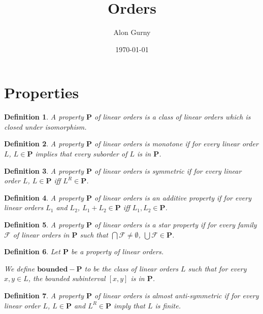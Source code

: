 \documentclass{article}
\author{Alon Gurny}
\title{Orders}
\date{\today}
\newtheorem{definition}{Definition}
\newcommand{\bounded}{\mathbf{bounded}}
\newcommand{\pp}{\mathbf{P}}
\begin{document}
\maketitle

\section{Properties}
\begin{definition}
  A \emph{property} $\pp$ of linear orders is a class of linear orders which
  is closed under isomorphism.
\end{definition}

\begin{definition}
  A property $\pp$ of linear orders is \emph{monotone} if for every linear order $L$,
  $L \in \pp$ implies that every suborder of $L$ is in $\pp$.
\end{definition}

\begin{definition}
  A property $\pp$ of linear orders is \emph{symmetric} if for every linear order $L$,
  $L \in \pp$ iff $L^R \in \pp$.
\end{definition}

\begin{definition}
  A property $\pp$ of linear orders is an \emph{additive property} if for every linear orders $L_1$ and $L_2$,
  $L_1 + L_2 \in \pp$ iff $L_1, L_2 \in \pp$.
\end{definition}

\begin{definition}
  A property $\pp$ of linear orders is a \emph{star property} if for every family
  $\mathcal{F}$ of linear orders in $\pp$ such that $\bigcap \mathcal{F} \ne \emptyset$,
  $\bigcup \mathcal{F} \in \pp$.
\end{definition}

\begin{definition}
  Let $\pp$ be a property of linear orders.

  We define $\bounded-\pp$ to be the class of linear orders $L$ such that for every $x, y \in L$,
  the bounded subinterval $[x, y]$ is in $\pp$.
\end{definition}

\begin{definition}
  A property $\pp$ of linear orders is \emph{almost anti-symmetric}
  if for every linear order $L$,
  $L \in \pp$ and $L^R \in \pp$ imply that $L$ is finite.
\end{definition}
\end{document}
